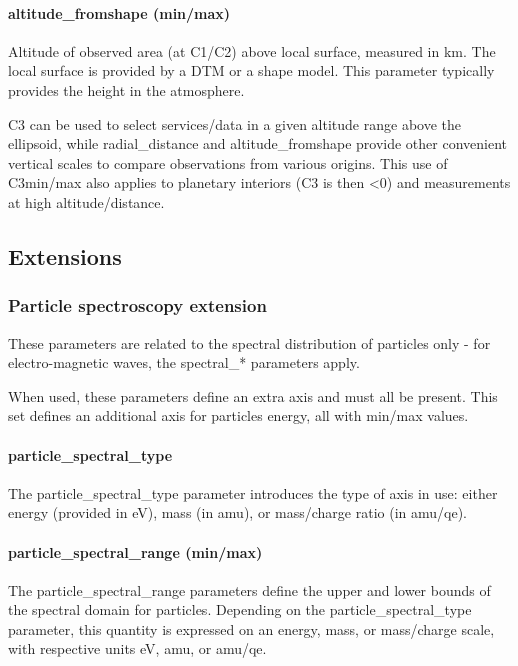 \documentclass[11pt,a4paper]{ivoa}
\begin{document}
\paragraph{altitude\_fromshape (min/max)}

Altitude of observed area (at C1/C2) above local surface, measured in km. The local surface is provided by a DTM or a shape model. This parameter typically provides the height in the atmosphere.

C3 can be used to select services/data in a given altitude range above the ellipsoid, while radial\_distance and altitude\_fromshape provide other convenient vertical scales to compare observations from various origins. This use of C3min/max also applies to planetary interiors (C3 is then <0) and measurements at high altitude/distance. 


\subsection{Extensions}

\subsubsection{Particle spectroscopy extension}

These parameters are related to the spectral distribution of particles only - for electro-magnetic waves, the spectral\_* parameters apply.

When used, these parameters define an extra axis and must all be present. This set defines an additional axis for particles energy, all with min/max values.

\paragraph{particle\_spectral\_type}

The particle\_spectral\_type parameter introduces the type of axis in use: either energy (provided in eV), mass (in amu), or mass/charge ratio (in amu/qe).

\paragraph{particle\_spectral\_range (min/max)}

The particle\_spectral\_range parameters define the upper and lower bounds of the spectral domain for particles. Depending on the particle\_spectral\_type parameter, this quantity is expressed on an energy, mass, or mass/charge scale, with respective units eV, amu, or amu/qe.
\end{document}
